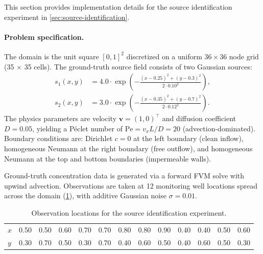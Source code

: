 \documentclass{article}
\theoremstyle{plain}
\theoremstyle{definition}
\theoremstyle{remark}
\begin{document}
This section provides implementation details for the source identification experiment in \cref{sec:source-identification}.

\paragraph{Problem specification.}
The domain is the unit square $[0,1]^2$ discretized on a uniform $36 \times 36$ node grid (35 $\times$ 35 cells).
The ground-truth source field consists of two Gaussian sources:
\begin{align}
  s_1(x,y) & = 4.0 \cdot \exp\!\left( -\frac{(x - 0.25)^2 + (y - 0.3)^2}{2 \cdot 0.10^2} \right), \\
  s_2(x,y) & = 3.0 \cdot \exp\!\left( -\frac{(x - 0.35)^2 + (y - 0.7)^2}{2 \cdot 0.12^2} \right).
\end{align}
The physics parameters are velocity $\bm{v} = (1, 0)^\top$ and diffusion coefficient $D = 0.05$, yielding a P\'eclet number of $\text{Pe} = v_x L / D = 20$ (advection-dominated).
Boundary conditions are: Dirichlet $c = 0$ at the left boundary (clean inflow), homogeneous Neumann at the right boundary (free outflow), and homogeneous Neumann at the top and bottom boundaries (impermeable walls).

Ground-truth concentration data is generated via a forward FVM solve with upwind advection.
Observations are taken at 12 monitoring well locations spread across the domain (\cref{tab:observation-locations}), with additive Gaussian noise $\sigma = 0.01$.

\begin{table}[h]
  \centering
  \caption{Observation locations for the source identification experiment.}
  \label{tab:observation-locations}
  \begin{tabular}{l*{12}{c}}
    \toprule
    $x$ & 0.50 & 0.50 & 0.60 & 0.70 & 0.70 & 0.80 & 0.80 & 0.90 & 0.40 & 0.40 & 0.50 & 0.60 \\
    $y$ & 0.30 & 0.70 & 0.50 & 0.30 & 0.70 & 0.40 & 0.60 & 0.50 & 0.40 & 0.60 & 0.50 & 0.30 \\
    \bottomrule
  \end{tabular}
\end{table}
\end{document}
